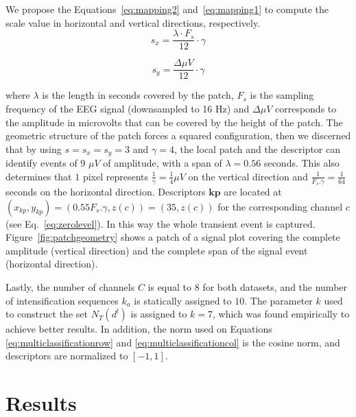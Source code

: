 \documentclass[utf8]{frontiersSCNS} %
\begin{document}
We propose the Equations~\ref{eq:mapping2} and~\ref{eq:mapping1} to compute the scale value in horizontal and vertical directions, respectively. 
\begin{equation}
s_x = \frac{\lambda \cdot F_s}{12} \cdot \gamma
\label{eq:mapping2}
\end{equation}

\begin{equation}
s_y= \frac{\Delta \mu V}{12} \cdot \gamma 
\label{eq:mapping1}
\end{equation}


\noindent where $ \lambda $ is the length in seconds covered by the patch, $ F_s $ is the sampling frequency of the EEG signal (downsampled to 16 Hz) and  $\Delta  \mu V $ corresponds to the amplitude in microvolts that can be covered by the height of the patch. The geometric structure of the patch forces a squared configuration, then we discerned that by using $ s =s_x =s_y = 3 $ and $ \gamma = 4 $,  the local patch and the descriptor can identify events of 9 $ \mu V $ of amplitude, with a span of $ \lambda = 0.56$ seconds.  This also determines that $ 1 $ pixel represents $ \frac{1}{\gamma}= \frac{1}{4} \mu V $ on the vertical direction and $\frac{1}{F_s.\gamma}=\frac{1}{64}$ seconds on the horizontal direction. Descriptors  $\mathbf{kp}$  are located at $ (x_{kp}, y_{kp} )= ( 0.55 F_s.\gamma, z(c) )= (35,  z(c)) $ for the corresponding channel $c$ (see Eq.~\ref{eq:zerolevel}).   In this way the whole transient event is captured. 
Figure~\ref{fig:patchgeometry} shows a patch of a signal plot covering the complete amplitude (vertical direction) and the complete span of the signal event (horizontal direction). 

Lastly, the number of channels $C$ is equal to $8$ for both datasets, and the number of intensification sequences $k_a$ is statically assigned to $10$.  The parameter $k$ used to construct the set $N_T(d^l)$ is assigned to $k=7$, which was found empirically to achieve better results.  In addition, the norm used on  Equations \ref{eq:multiclassificationrow} and \ref{eq:multiclassificationcol} is the cosine norm, and descriptors are normalized to $ \left[ -1, 1 \right] $.

\section{Results} \label{Results}
\label{section:results}
\end{document}
